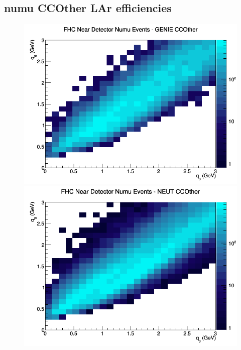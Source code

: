 \subsection{numu CCOther LAr efficiencies}
\begin{figure}[h]
\includegraphics[width=\linewidth]{eff_q0_q3/LAr/CCOther_FHC_ND_numu_q3_q0_GENIE.png}
\endminipage
{}
\includegraphics[width=\linewidth]{eff_q0_q3/LAr/CCOther_FHC_ND_numu_q3_q0_NEUT.png}
\endminipage
{}

\end{figure}

